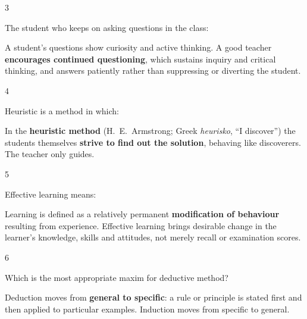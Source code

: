 \begin{question}{3}
{The student who keeps on asking questions in the class:\par}
\begin{explain}
A student's questions show curiosity and active thinking. A good teacher \textbf{encourages continued questioning}, which sustains inquiry and critical thinking, and answers patiently rather than suppressing or diverting the student.
\end{explain}
\end{question}

\begin{question}{4}
{Heuristic is a method in which:\par}
\begin{explain}
In the \textbf{heuristic method} (H.~E.~Armstrong; Greek \emph{heurisko}, ``I discover'') the students themselves \textbf{strive to find out the solution}, behaving like discoverers. The teacher only guides.
\end{explain}
\end{question}

\begin{question}{5}
{Effective learning means:\par}
\begin{explain}
Learning is defined as a relatively permanent \textbf{modification of behaviour} resulting from experience. Effective learning brings desirable change in the learner's knowledge, skills and attitudes, not merely recall or examination scores.
\end{explain}
\end{question}

\begin{question}{6}
{Which is the most appropriate maxim for deductive method?\par}
\begin{explain}
Deduction moves from \textbf{general to specific}: a rule or principle is stated first and then applied to particular examples. Induction moves from specific to general.
\end{explain}
\end{question}

